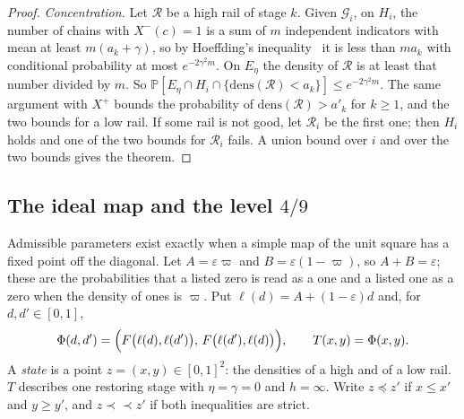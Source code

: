 \documentclass[11pt]{amsart}
\theoremstyle{definition}
\theoremstyle{remark}
\newcommand{\eps}{\varepsilon}
\newcommand{\PP}{\mathbb{P}}
\begin{document}
\begin{proof}
\emph{Concentration.} Let $\mathcal R$ be a high rail of stage $k$. Given $\mathcal G_i$, on $H_i$,
the number of chains with $X^-(c)=1$ is a sum of $m$ independent indicators with mean at least
$m(a_k+\gamma)$, so by Hoeffding's inequality~\cite{hoeffding} it is less than $ma_k$ with
conditional probability at most $e^{-2\gamma^2m}$. On $E_\eta$ the density of $\mathcal R$ is at
least that number divided by $m$. So
$\PP[E_\eta\cap H_i\cap\{\mathrm{dens}(\mathcal R)<a_k\}]\le e^{-2\gamma^2m}$. The same argument
with $X^+$ bounds the probability of $\mathrm{dens}(\mathcal R)>a'_k$ for $k\ge1$, and the two
bounds for a low rail. If some rail is not good, let $\mathcal R_i$ be the first one; then $H_i$
holds and one of the two bounds for $\mathcal R_i$ fails. A union bound over $i$ and over the two
bounds gives the theorem.
\end{proof}

\subsection{The ideal map and the level \texorpdfstring{$4/9$}{4/9}}

Admissible parameters exist exactly when a simple map of the unit square has a fixed point off the
diagonal. Let $A=\eps\varpi$ and $B=\eps(1-\varpi)$, so $A+B=\eps$; these are the probabilities
that a listed zero is read as a one and a listed one as a zero when the density of ones is
$\varpi$. Put $\ell(d)=A+(1-\eps)d$ and, for $d,d'\in[0,1]$,
\[
\Phi(d,d')=\Bigl(F\bigl(\ell(d),\ell(d')\bigr),\,F\bigl(\ell(d'),\ell(d)\bigr)\Bigr),\qquad T(x,y)=\Phi(x,y).
\]
A \emph{state} is a point $z=(x,y)\in[0,1]^2$: the densities of a high and of a low rail. $T$
describes one restoring stage with $\eta=\gamma=0$ and $h=\infty$. Write $z\preceq z'$ if
$x\le x'$ and $y\ge y'$, and $z\prec\!\!\prec z'$ if both inequalities are strict.
\end{document}
